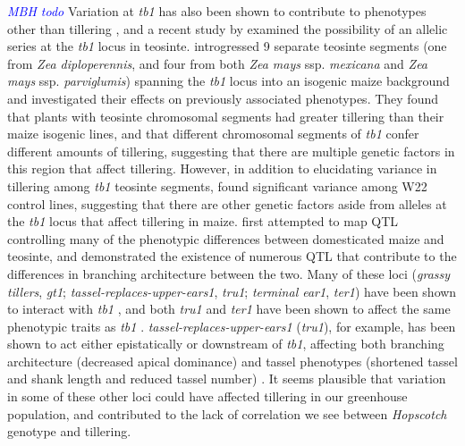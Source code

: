 \documentclass[11pt]{article}
\newcommand{\jri}[1]{\textcolor{blue}{ \emph{\scriptsize  #1}} }
\begin{document}
\begin{linenumbers}
\begin{flushleft}
\jri{MBH todo} Variation at \emph{tb1} has also been shown to contribute to phenotypes other than tillering \citep{Clark2006}, and a recent study by \citet{StuderDoebley2012} examined the possibility of an allelic series at the \emph{tb1} locus in teosinte. \citet{StuderDoebley2012} introgressed 9 separate teosinte segments (one from \emph{Zea diploperennis}, and four from both \emph{Zea mays} ssp. \emph{mexicana} and \emph{Zea mays} ssp. \emph{parviglumis}) spanning the \emph{tb1} locus into an isogenic maize background and investigated their effects on previously associated phenotypes. They found that plants with teosinte chromosomal segments had greater tillering than their maize isogenic lines, and that different chromosomal segments of \emph{tb1} confer different amounts of tillering, suggesting that there are multiple genetic factors in this region that affect tillering. However, in addition to elucidating variance in tillering among \emph{tb1} teosinte segments, \citet{StuderDoebley2012} found significant variance among W22 control lines, suggesting that there are other genetic factors aside from alleles at the \emph{tb1} locus that affect tillering in maize. \citet{DoebleyStec1991, DoebleyStec1993} first attempted to map QTL controlling many of the phenotypic differences between domesticated maize and teosinte, and demonstrated the existence of numerous QTL that contribute to the differences in branching architecture between the two. Many of these loci (\emph{grassy tillers}, \emph{gt1}; \emph{tassel-replaces-upper-ears1}, \emph{tru1}; \emph{terminal ear1}, \emph{ter1}) have been shown to interact with \emph{tb1} \citep{Whipple2011, Li2012},  and both \emph{tru1} and \emph{ter1} have been shown to affect the same phenotypic traits as \emph{tb1} \citep{DoebleyStecGustus1995}. \emph{tassel-replaces-upper-ears1} (\emph{tru1}), for example, has been shown to act either epistatically or downstream of \emph{tb1}, affecting both branching architecture (decreased apical dominance) and tassel phenotypes (shortened tassel and shank length and reduced tassel number) \citep{Li2012}. It seems plausible that variation in some of these other loci could have affected tillering in our greenhouse population, and contributed to the lack of correlation we see between \emph{Hopscotch} genotype and tillering. 


\end{flushleft}
\end{linenumbers}
\end{document}
